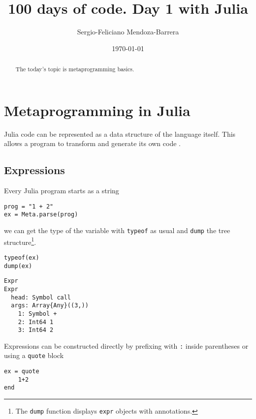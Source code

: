 \documentclass[letterpaper]{tufte-handout}
\author{Sergio-Feliciano Mendoza-Barrera}
\date{\today}
\title{100 days of code. Day 1 with Julia}
\begin{document}
\maketitle
\begin{abstract}
The today's topic is metaprogramming basics.
\end{abstract}

\section{Metaprogramming in Julia}
\label{sec:org9c1a024}

Julia code can be represented as a data structure of the language
itself. This allows a program to transform and generate its own code
\citep[p. 204]{lauwens2020}.

\subsection{Expressions}
\label{sec:orgd7b09f2}

Every Julia program starts as a string

\begin{verbatim}
prog = "1 + 2"
ex = Meta.parse(prog)
\end{verbatim}

we can get the type of the variable with \texttt{typeof} as usual and \texttt{dump}
the tree structure\footnote{The \texttt{dump} function displays \texttt{expr} objects
with annotations.}.

\begin{verbatim}
typeof(ex)
dump(ex)
\end{verbatim}

\begin{verbatim}
Expr
Expr
  head: Symbol call
  args: Array{Any}((3,))
    1: Symbol +
    2: Int64 1
    3: Int64 2
\end{verbatim}


\noindent Expressions can be constructed directly by prefixing with \texttt{:}
inside parentheses or using a \texttt{quote} block

\begin{verbatim}
ex = quote
    1+2
end
\end{verbatim}
\end{document}
